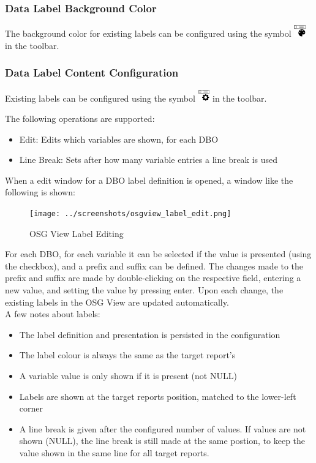 \subsubsection{Data Label Background Color}

The background color for existing labels can be configured using the symbol \includegraphics[width=0.5cm,frame]{../../data/icons/label_color.png} in the toolbar.

\subsubsection{Data Label Content Configuration}

Existing labels can be configured using the symbol \includegraphics[width=0.5cm,frame]{../../data/icons/label_edit.png} in the toolbar.

The following operations are supported:

\begin{itemize}
 \item Edit: Edits which variables are shown, for each DBO
 \item Line Break: Sets after how many variable entries a line break is used
\end{itemize}

When a edit window for a DBO label definition is opened, a window like the following is shown:

\begin{figure}[H]
    \texttt{[image: ../screenshots/osgview\_label\_edit.png]}
  \caption{OSG View Label Editing}
\end{figure}

For each DBO, for each variable it can be selected if the value is presented (using the checkbox), and a prefix and suffix can be defined. The changes made to the prefix and suffix are made by double-clicking on the respective field, entering a new value, and setting the value by pressing enter. Upon each change, the existing labels in the OSG View are updated automatically. \\

A few notes about labels:

\begin{itemize}
 \item The label definition and presentation is persisted in the configuration
 \item The label colour is always the same as the target report's
 \item A variable value is only shown if it is present (not NULL)
 \item Labels are shown at the target reports position, matched to the lower-left corner
 \item A line break is given after the configured number of values. If values are not shown (NULL), the line break is still made at the same postion, to keep the value shown in the same line for all target reports.
\end{itemize}

